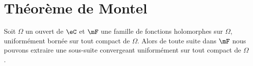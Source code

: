 \section{Théorème de Montel}

\begin{theorem}   \label{ThoXLyCzol}
    Soit \( \Omega\) un ouvert de \( \eC\) et \( \mF\) une famille de fonctions holomorphes sur \( \Omega\), uniformément bornée sur tout compact de \( \Omega\). Alors de toute suite dans \( \mF\) nous pouvons extraire une sous-suite convergeant uniformément sur tout compact de \( \Omega\).
\end{theorem}

